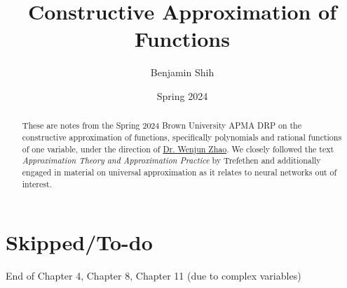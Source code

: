 \documentclass{article}
\title{Constructive Approximation of Functions}
\author{Benjamin Shih}
\date{Spring 2024}
\begin{document}
\begin{titlepage}
\thispagestyle{empty}
\maketitle

\begin{abstract}
  These are notes from the Spring 2024 Brown University APMA DRP on the constructive approximation of functions, specifically polynomials and rational functions of one variable, under the direction of \href{https://wenjunzhaowo.github.io}{Dr. Wenjun Zhao}. We closely followed the text \emph{Approximation Theory and Approximation Practice} by Trefethen \cite{atap} and additionally engaged in material on universal approximation \cite{surv} as it relates to neural networks out of interest.
\end{abstract}

\tableofcontents
\end{titlepage}






\section{Skipped/To-do}
End of Chapter 4, Chapter 8, Chapter 11 (due to complex variables)

\newpage


\end{document}
